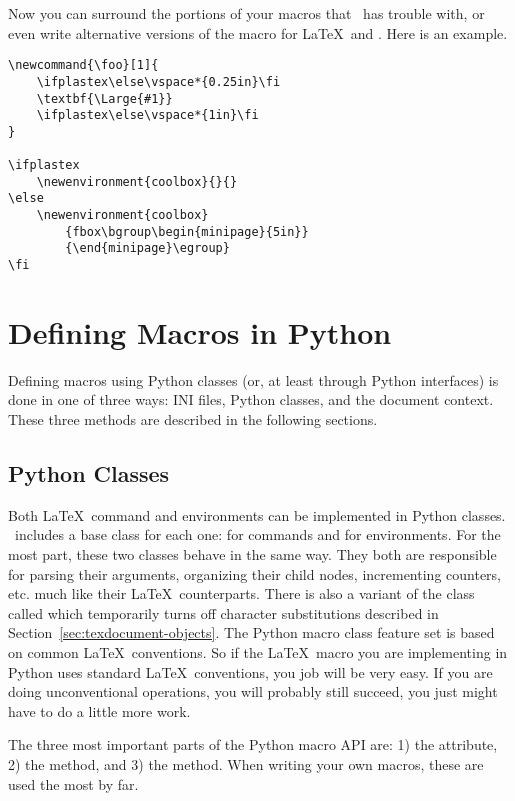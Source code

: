 Now you can surround the portions of your macros that \plasTeX\ has 
trouble with, or even write alternative versions of the macro for 
\LaTeX\ and \plasTeX.  Here is an example.
\begin{verbatim}
\newcommand{\foo}[1]{
    \ifplastex\else\vspace*{0.25in}\fi
    \textbf{\Large{#1}}
    \ifplastex\else\vspace*{1in}\fi
}

\ifplastex
    \newenvironment{coolbox}{}{}
\else
    \newenvironment{coolbox}
        {fbox\bgroup\begin{minipage}{5in}}
        {\end{minipage}\egroup}
\fi
\end{verbatim}


\section{Defining Macros in Python}

Defining macros using Python classes (or, at least through Python interfaces)
is done in one of three ways: INI files, Python classes, and the document
context.  These three methods are described in the following sections.


\subsection{Python Classes\label{sec:macroclasses}}

Both \LaTeX\ command and environments can be implemented in Python
classes.  \plasTeX\ includes a base class for each one: 
for commands and  for environments.  For the most
part, these two classes behave in the same way.  They both are 
responsible for parsing their arguments, organizing their child nodes,
incrementing counters, etc. much like their \LaTeX\ counterparts.
There is also a variant of the  class called 
 which temporarily turns off character
substitutions described in Section~\ref{sec:texdocument-objects}.
The Python macro class feature set is based on common \LaTeX\ 
conventions.  So if the \LaTeX\ macro you are implementing in Python
uses standard \LaTeX\ conventions, you job will be very easy.  If you
are doing unconventional operations, you will probably still succeed,
you just might have to do a little more work.

The three most important parts of the Python macro API are: 1) the 
\member{args} attribute, 2) the \method{invoke} method, and 3) the
\member{digest} method.  When writing your own macros, these are
used the most by far.

